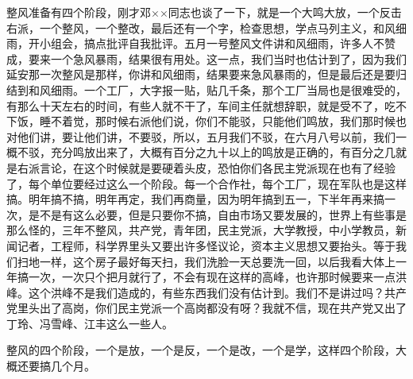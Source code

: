 整风准备有四个阶段，刚才邓××同志也谈了一下，就是一个大鸣大放，一个反击右派，一个整风，一个整改，最后还有一个字，检查思想，学点马列主义，和风细雨，开小组会，搞点批评自我批评。五月一号整风文件讲和风细雨，许多人不赞成，要来一个急风暴雨，结果很有用处。这一点，我们当时也估计到了，因为我们延安那一次整风是那样，你讲和风细雨，结果要来急风暴雨的，但是最后还是要归结到和风细雨。一个工厂，大字报一贴，贴几千条，那个工厂当局也是很难受的，有那么十天左右的时间，有些人就不干了，车间主任就想辞职，就是受不了，吃不下饭，睡不着觉，那时候右派他们说，你们不能驳，只能他们鸣放，我们那时候也对他们讲，要让他们讲，不要驳，所以，五月我们不驳，在六月八号以前，我们一概不驳，充分鸣放出来了，大概有百分之九十以上的鸣放是正确的，有百分之几就是右派言论，在这个时候就是要硬着头皮，恐怕你们各民主党派现在也有了经验了，每个单位要经过这么一个阶段。每一个合作社，每个工厂，现在军队也是这样搞。明年搞不搞，明年再定，我们再商量，因为明年搞到五一，下半年再来搞一次，是不是有这么必要，但是只要你不搞，自由市场又要发展的，世界上有些事是那么怪的，三年不整风，共产党，青年团，民主党派，大学教授，中小学教员，新闻记者，工程师，科学界里头又要出许多怪议论，资本主义思想又要抬头。等于我们扫地一样，这个房子最好每天扫，我们洗脸一天总要洗一回，以后我看大体上一年搞一次，一次只个把月就行了，不会有现在这样的高峰，也许那时候要来一点洪峰。这个洪峰不是我们造成的，有些东西我们没有估计到。我们不是讲过吗？共产党里头出了高岗，你们民主党派一个高岗都没有呀？我就不信，现在共产党又出了丁玲、冯雪峰、江丰这么一些人。

整风的四个阶段，一个是放，一个是反，一个是改，一个是学，这样四个阶段，大概还要搞几个月。

